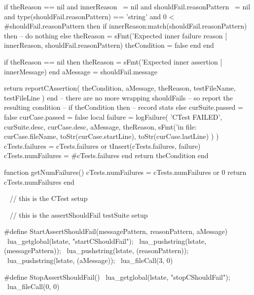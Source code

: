     if theReason == nil
      and innerReason ~= nil
      and shouldFail.reasonPattern ~= nil
      and type(shouldFail.reasonPattern) == 'string'
      and 0 < #shouldFail.reasonPattern then
      if innerReason:match(shouldFail.reasonPattern) then
        -- do nothing
      else
        theReason = sFmt('Expected inner failure reason [%
          innerReason, shouldFail.reasonPattern)
        theCondition = false
      end
    end
    
    if theReason == nil then
      theReason = sFmt('Expected inner assertion [%
        innerMessage)
    end
    aMessage = shouldFail.message
    
    return reportCAssertion(
      theCondition,
      aMessage,
      theReason,
      testFileName,
      testFileLine
    )
  end
  -- there are no more wrapping shouldFails
  -- so report the resulting condition
  --
  if theCondition then
    -- record stats
  else
    curSuite.passed = false
    curCase.passed  = false
    local failure = logFailure(
      'CTest FAILED',
      curSuite.desc,
      curCase.desc,
      aMessage,
      theReason,
      sFmt('in file: %
        curCase.fileName,
        toStr(curCase.startLine),
        toStr(curCase.lastLine)
      )
    )
    cTests.failures = cTests.failures or { }
    tInsert(cTests.failures, failure)
    cTests.numFailures = #cTests.failures
  end
  return theCondition
end

function getNumFailures()
  cTests.numFailures = cTests.numFailures or 0
  return cTests.numFailures
end
\stopLuaCode

\CTestsSetup\
\startCTest
  // this is the CTest setup
\stopCTest


\CTestSuiteSetup\
\startCTest
  // this is the assertShouldFail testSuite setup
\stopCTest

\startCHeader
#define StartAssertShouldFail(messagePattern, reasonPattern, aMessage) \
  lua_getglobal(lstate, "startCShouldFail");                           \
  lua_pushstring(lstate, (messagePattern));                            \
  lua_pushstring(lstate, (reasonPattern));                             \
  lua_pushstring(lstate, (aMessage));                                  \
  lua_fileCall(3, 0)

#define StopAssertShouldFail()              \
  lua_getglobal(lstate, "stopCShouldFail"); \
  lua_fileCall(0, 0)
\stopCHeader

